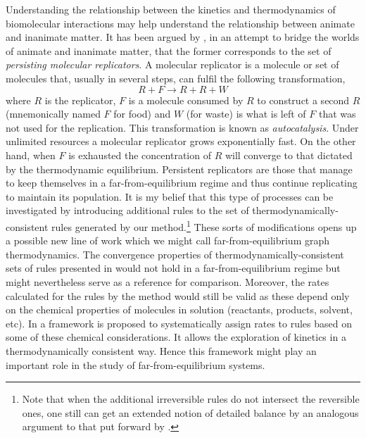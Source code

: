 Understanding the relationship between the kinetics and thermodynamics
of biomolecular interactions may help understand
the relationship between animate and inanimate matter.
It has been argued by \citet{pross},
in an attempt to bridge the worlds of animate and inanimate matter,
that the former %
corresponds to the set of \emph{persisting molecular replicators}.
A molecular replicator is a molecule or set of molecules that,
usually in several steps,
can fulfil the following transformation,
\[ R + F \to R + R + W \]
where $R$ is the replicator,
$F$ is a molecule consumed by $R$ to construct a second $R$
(mnemonically named $F$ for food)
and $W$ (for waste) is what is left of $F$
that was not used for the replication.
This transformation is known as \emph{autocatalysis}.
Under unlimited resources a molecular replicator
grows exponentially fast.
On the other hand, when $F$ is exhausted
the concentration of $R$ will converge to that
dictated by the thermodynamic equilibrium.
Persistent replicators are those that manage to
keep themselves in a far-from-equilibrium regime
and thus continue replicating to maintain its population.
It is my belief that this type of processes can be investigated
by introducing additional rules
to the set of thermodynamically-consistent rules
generated by our method.\footnote{
  Note that when the additional irreversible rules
  do not intersect the reversible ones,
  one still can get an extended notion of detailed balance
  by an analogous argument to that put forward by \citet{gorban}.}
These sorts of modifications opens up
a possible new line of work which we might call
far-from-equilibrium graph thermodynamics.
The convergence properties
of thermodynamically-consistent sets of rules
presented in 
would not hold in a far-from-equilibrium regime
but might nevertheless serve as a reference for comparison.
Moreover, the rates calculated for the rules by the method
would still be valid as these depend only on
the chemical properties of molecules in solution
(reactants, products, solvent, etc).
In  a framework is proposed
to systematically assign rates to rules based on
some of these chemical considerations.
It allows the exploration of kinetics
in a thermodynamically consistent way.
Hence this framework might play an important role
in the study of far-from-equilibrium systems.


